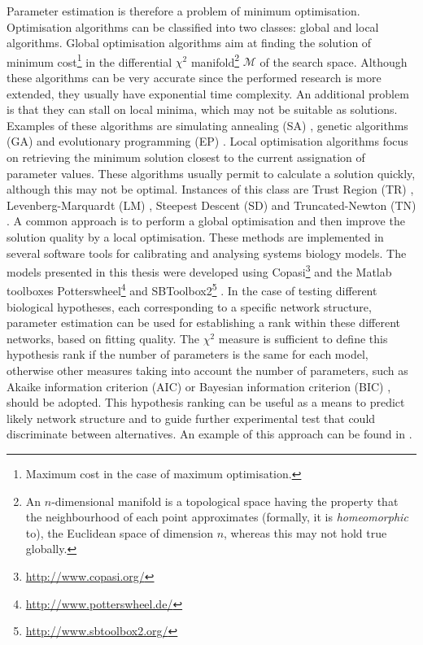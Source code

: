 Parameter estimation is therefore a problem of minimum optimisation. Optimisation algorithms can be classified into two classes: global and local algorithms. Global optimisation algorithms aim at finding the solution of minimum cost\footnote{Maximum cost in the case of maximum optimisation.} in the differential $\chi^2$ manifold\footnote{An $n$-dimensional manifold is a topological space having the property that the neighbourhood of each point approximates (formally, it is \emph{homeomorphic} to), the Euclidean space of dimension $n$, whereas this may not hold true globally.} $\mathcal{M}$ of the search space. Although these algorithms can be very accurate since the performed research is more extended, they usually have exponential time complexity. An additional problem is that they can stall on local minima, which may not be suitable as solutions. Examples of these algorithms are simulating annealing (SA) \citep{Kirkpatrick83, Corana1987}, genetic algorithms (GA) \citep{Baeck1993, Michalewicz1994, 
Mitchell1998, Baeck1997} and evolutionary programming (EP) \citep{Fogel1992, Baeck1993, Baeck1997}. Local optimisation algorithms focus on retrieving the minimum solution closest to the current assignation of parameter values. These algorithms usually permit to calculate a solution quickly, although this may not be optimal. Instances of this class are Trust Region (TR) \citep{Celis1984, Byrd1987, Yuan2000}, Levenberg-Marquardt (LM) \citep{Levenberg1944, Marquardt1963}, Steepest Descent (SD) \citep{Fogel1992} and Truncated-Newton (TN) \citep{Gill1981, Nash1984}. A common approach is to perform a global optimisation and then improve the solution quality by a local optimisation. These methods are implemented in several software tools for calibrating and analysing systems biology models. The models presented in this thesis were developed using Copasi\footnote{\href{http://www.copasi.org/}{http://www.copasi.org/}} \citep{Hoops2006} and the Matlab toolboxes Potterswheel\footnote{\href{http://www.potterswheel.de/}{
http://www.potterswheel.de/}} \citep{Maiwald2008, Hengl2007, Raue2009} and SBToolbox2\footnote{\href{http://www.sbtoolbox2.org/}{http://www.sbtoolbox2.org/}} \citep{Schmidt2006}. 
In the case of testing different biological hypotheses, each corresponding to a specific network structure, parameter estimation can be used for establishing a rank within these different networks, based on fitting quality. The $\chi^2$ measure is sufficient to define this hypothesis rank if the number of parameters is the same for each model, otherwise other measures taking into account the number of parameters, such as Akaike information criterion (AIC) \citep{Akaike1973} or Bayesian information criterion (BIC) \citep{Schwarz1978}, should be adopted. This hypothesis ranking can be useful as a means to predict likely network structure and to guide further experimental test that could discriminate between alternatives. An example of this approach can be found in \citep{Sonntag2012}.

